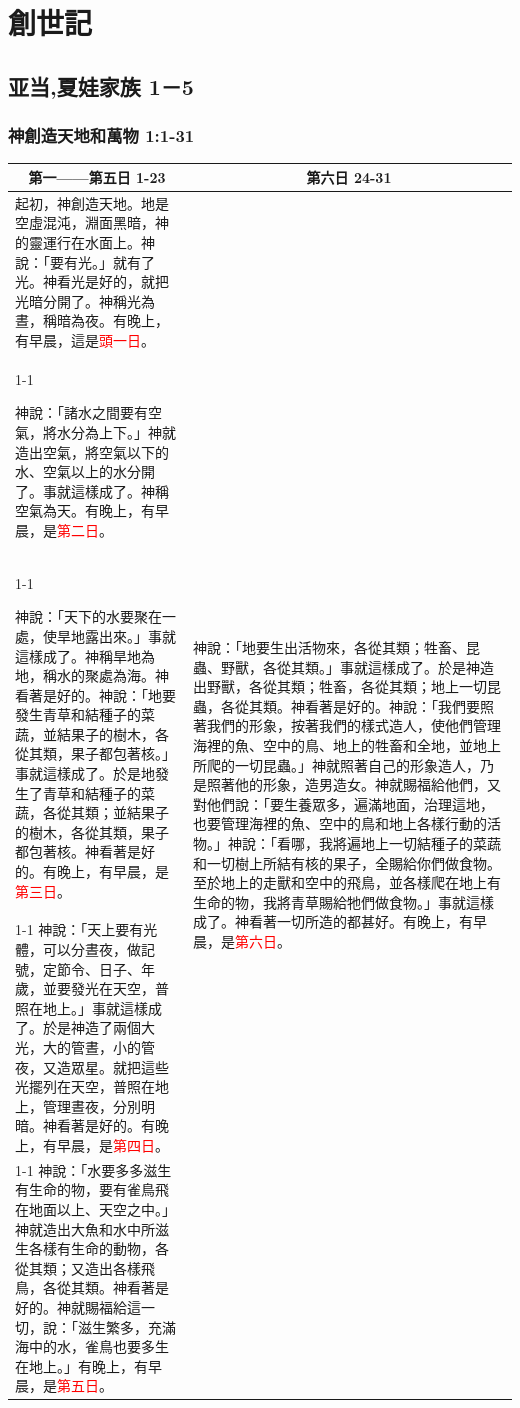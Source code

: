 
\chapter{創世記}

\section{亚当,夏娃家族 1－5}
\subsection{神創造天地和萬物 1:1-31}
\begin{table}[H]
\centering
\begin{tabular}{p{11.25cm}|p{}}\hline\hline
\multicolumn{1}{c|}{第一——第五日 1-23}&\multicolumn{1}{c}{第六日 24-31}\\\hline
起初，神創造天地。地是空虛混沌，淵面黑暗，神的靈運行在水面上。神說：「要有光。」就有了光。神看光是好的，就把光暗分開了。神稱光為晝，稱暗為夜。有晚上，有早晨，這是\textcolor{red}{頭一日}。&\multirow{5}{6.25cm}{神說：「地要生出活物來，各從其類；牲畜、昆蟲、野獸，各從其類。」事就這樣成了。於是神造出野獸，各從其類；牲畜，各從其類；地上一切昆蟲，各從其類。神看著是好的。神說：「我們要照著我們的形象，按著我們的樣式造人，使他們管理海裡的魚、空中的鳥、地上的牲畜和全地，並地上所爬的一切昆蟲。」神就照著自己的形象造人，乃是照著他的形象，造男造女。神就賜福給他們，又對他們說：「要生養眾多，遍滿地面，治理這地，也要管理海裡的魚、空中的鳥和地上各樣行動的活物。」神說：「看哪，我將遍地上一切結種子的菜蔬和一切樹上所結有核的果子，全賜給你們做食物。至於地上的走獸和空中的飛鳥，並各樣爬在地上有生命的物，我將青草賜給牠們做食物。」事就這樣成了。神看著一切所造的都甚好。有晚上，有早晨，是\textcolor{red}{第六日}。}\\\cline{1-1}

神說：「諸水之間要有空氣，將水分為上下。」神就造出空氣，將空氣以下的水、空氣以上的水分開了。事就這樣成了。神稱空氣為天。有晚上，有早晨，是\textcolor{red}{第二日}。&\\\cline{1-1}

神說：「天下的水要聚在一處，使旱地露出來。」事就這樣成了。神稱旱地為地，稱水的聚處為海。神看著是好的。神說：「地要發生青草和結種子的菜蔬，並結果子的樹木，各從其類，果子都包著核。」事就這樣成了。於是地發生了青草和結種子的菜蔬，各從其類；並結果子的樹木，各從其類，果子都包著核。神看著是好的。有晚上，有早晨，是\textcolor{red}{第三日}。&\\\cline{1-1}
神說：「天上要有光體，可以分晝夜，做記號，定節令、日子、年歲，並要發光在天空，普照在地上。」事就這樣成了。於是神造了兩個大光，大的管晝，小的管夜，又造眾星。就把這些光擺列在天空，普照在地上，管理晝夜，分別明暗。神看著是好的。有晚上，有早晨，是\textcolor{red}{第四日}。&\\\cline{1-1}
神說：「水要多多滋生有生命的物，要有雀鳥飛在地面以上、天空之中。」神就造出大魚和水中所滋生各樣有生命的動物，各從其類；又造出各樣飛鳥，各從其類。神看著是好的。神就賜福給這一切，說：「滋生繁多，充滿海中的水，雀鳥也要多生在地上。」有晚上，有早晨，是\textcolor{red}{第五日}。&\\\hline
\end{tabular}
\end{table}

